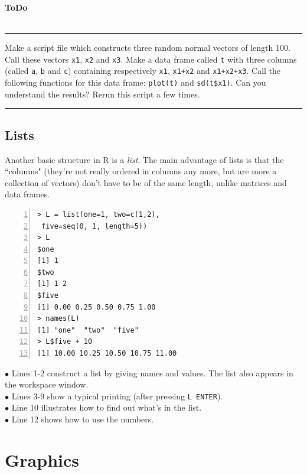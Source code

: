 \documentclass[a4paper,11pt,twocolumn,tablecaptionabove]{scrartcl}
\newenvironment{ToDo} {%
  \begin{flushright}
    \hfill
    \begin{minipage}{0.95\columnwidth}         %
    \textsf{\textbf{ToDo}} \\
      \vspace{-0.85cm}\\
      {\color{Gray}\rule[-0.1cm]{\columnwidth}{1.5pt}}} { %
      {\color{Gray} \rule[0.3cm]{\columnwidth}{1.5pt}}
    \end{minipage}
    \vspace{1em}
  \end{flushright}
  }
\begin{document}
\begin{ToDo}
Make a script file which constructs three random normal vectors of length 100. Call these vectors \texttt{x1}, \texttt{x2} and \texttt{x3}. Make a data frame called \texttt{t} with three columns (called \texttt{a}, \texttt{b} and \texttt{c}) containing respectively \texttt{x1}, \texttt{x1+x2} and \texttt{x1+x2+x3}. Call the following functions for this data frame: \texttt{plot(t)} and \texttt{sd(t\$x1)}. Can you understand the results? Rerun this script a few times.\\
\end{ToDo}

\subsection{Lists}

Another basic structure in R is a \emph{list}. The main advantage of lists is that the ``columns" (they're not really ordered in columns any more, but are more a collection of vectors) don't have to be of the same length, unlike matrices and data frames. 

\begin{Verbatim}[frame=single,numbers=left,gobble=0, xleftmargin=0.35cm, numbersep=0.1cm]
> L = list(one=1, two=c(1,2), 
 five=seq(0, 1, length=5))
> L
$one
[1] 1
$two
[1] 1 2
$five
[1] 0.00 0.25 0.50 0.75 1.00
> names(L)
[1] "one"  "two"  "five"
> L$five + 10
[1] 10.00 10.25 10.50 10.75 11.00
\end{Verbatim}

\noindent $\bullet$ Lines 1-2 construct a list by giving names and values. The list also appears in the workspace window.\\
\noindent $\bullet$ Lines 3-9 show a typical printing (after pressing \texttt{L ENTER}). \\
\noindent $\bullet$ Line 10 illustrates how to find out what's in the list.\\
\noindent $\bullet$ Line 12 shows how to use the numbers. \\


\section{Graphics}
\label{sec:some-plotting}
\end{document}
